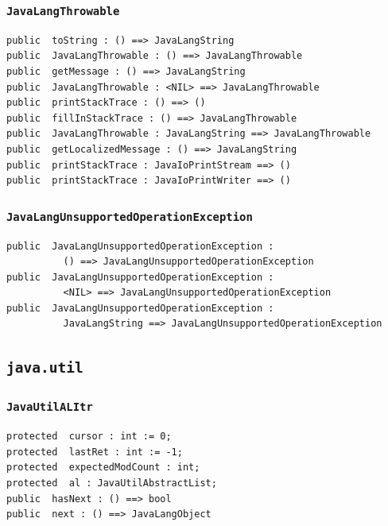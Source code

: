 \documentclass[\pformat,12pt]{article}
\begin{document}
\subsubsection{\texttt{JavaLangThrowable}}
\begin{small}
\begin{verbatim}
public  toString : () ==> JavaLangString
public  JavaLangThrowable : () ==> JavaLangThrowable
public  getMessage : () ==> JavaLangString
public  JavaLangThrowable : <NIL> ==> JavaLangThrowable
public  printStackTrace : () ==> ()
public  fillInStackTrace : () ==> JavaLangThrowable
public  JavaLangThrowable : JavaLangString ==> JavaLangThrowable
public  getLocalizedMessage : () ==> JavaLangString
public  printStackTrace : JavaIoPrintStream ==> ()
public  printStackTrace : JavaIoPrintWriter ==> ()
\end{verbatim}
\end{small}

\subsubsection{\texttt{JavaLangUnsupportedOperationException}}
\begin{small}
\begin{verbatim}
public  JavaLangUnsupportedOperationException : 
          () ==> JavaLangUnsupportedOperationException
public  JavaLangUnsupportedOperationException : 
          <NIL> ==> JavaLangUnsupportedOperationException
public  JavaLangUnsupportedOperationException : 
          JavaLangString ==> JavaLangUnsupportedOperationException
\end{verbatim}
\end{small}

\subsection{\texttt{java.util}}

\subsubsection{\texttt{JavaUtilALItr}}
\begin{small}
\begin{verbatim}
protected  cursor : int := 0;
protected  lastRet : int := -1;
protected  expectedModCount : int;
protected  al : JavaUtilAbstractList;
public  hasNext : () ==> bool
public  next : () ==> JavaLangObject
\end{verbatim}
\end{small}
\end{document}
